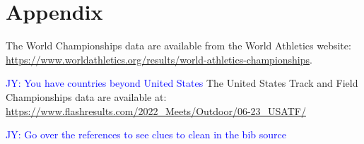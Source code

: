 \documentclass[12pt, letterpaper, titlepage]{article}
\newcommand{\jy}[1]{\textcolor{blue}{JY: #1}}
\newcommand{\eds}[1]{\textcolor{red}{EDS: (#1)}}
\newcommand{\of}[1]{\textcolor{violet}{OF: #1}}
\begin{document}







\section*{Appendix}
\label{sec:Appendix}
The World Championships data are available from the World Athletics website:
\url{https://www.worldathletics.org/results/world-athletics-championships}.

\jy{You have countries beyond United States}
The United States Track and Field Championships data are available at: 
\url{https://www.flashresults.com/2022_Meets/Outdoor/06-23_USATF/}



\jy{Go over the references to see clues to clean in the bib source}


\end{document}
